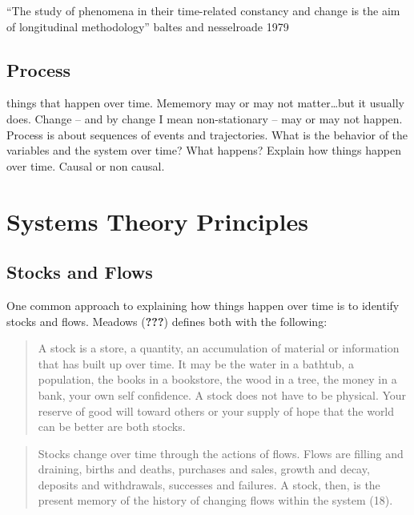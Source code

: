 \documentclass[english,,man]{apa6}
\theoremstyle{definition}
\theoremstyle{definition}
\theoremstyle{definition}
\theoremstyle{remark}
\begin{document}
\enquote{The study of phenomena in their time-related constancy and
change is the aim of longitudinal methodology} baltes and nesselroade
1979

\hypertarget{process}{%
\subsection{Process}\label{process}}

things that happen over time. Mememory may or may not matter\ldots{}but
it usually does. Change -- and by change I mean non-stationary -- may or
may not happen. Process is about sequences of events and trajectories.
What is the behavior of the variables and the system over time? What
happens? Explain how things happen over time. Causal or non causal.

\hypertarget{systems-theory-principles}{%
\section{Systems Theory Principles}\label{systems-theory-principles}}

\hypertarget{stocks-and-flows}{%
\subsection{Stocks and Flows}\label{stocks-and-flows}}

One common approach to explaining how things happen over time is to
identify stocks and flows. Meadows ({\textbf{???}}) defines both with
the following:

\begin{quote}
A stock is a store, a quantity, an accumulation of material or
information that has built up over time. It may be the water in a
bathtub, a population, the books in a bookstore, the wood in a tree, the
money in a bank, your own self confidence. A stock does not have to be
physical. Your reserve of good will toward others or your supply of hope
that the world can be better are both stocks.
\end{quote}

\begin{quote}
Stocks change over time through the actions of flows. Flows are filling
and draining, births and deaths, purchases and sales, growth and decay,
deposits and withdrawals, successes and failures. A stock, then, is the
present memory of the history of changing flows within the system (18).
\end{quote}
\end{document}
